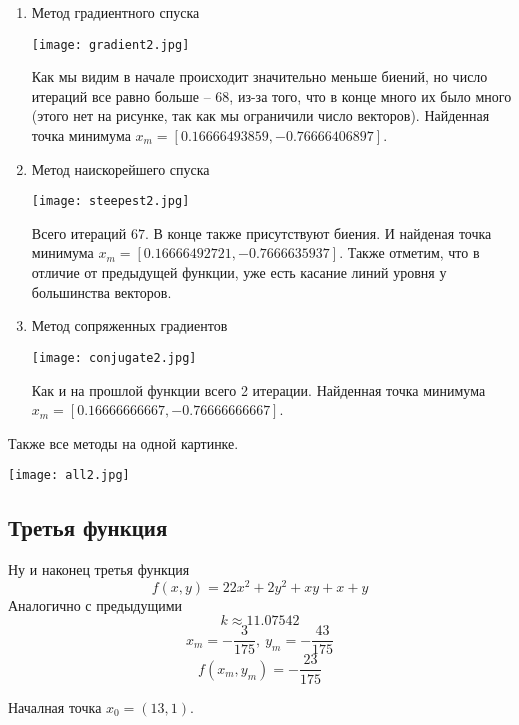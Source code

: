 \begin{enumerate}
    \item Метод градиентного спуска
    
    \texttt{[image: gradient2.jpg]}

    Как мы видим в начале происходит значительно меньше биений, но число
    итераций все равно больше -- 68, из-за того, что в конце много их было много
    (этого нет на рисунке, так как мы ограничили число векторов).
    Найденная точка минимума $x_m = [0.16666493859, -0.76666406897]$.



    \item Метод наискорейшего спуска

    \texttt{[image: steepest2.jpg]}

    Всего итераций $67$. В конце также присутствуют биения. 
    И найденая точка минимума \newline $x_m = [0.16666492721, -0.7666635937]$.
    Также отметим, что в отличие от предыдущей функции, уже есть касание линий уровня у большинства векторов.

    \item Метод сопряженных градиентов
    
    \texttt{[image: conjugate2.jpg]}

    Как и на прошлой функции всего 2 итерации. Найденная точка минимума $x_m = [0.16666666667, -0.76666666667]$.

\end{enumerate}

Также все методы на одной картинке.

\texttt{[image: all2.jpg]}

\subsection{Третья функция}
Ну и наконец третья функция $$f(x, y) = 22x^2 + 2y^2 + xy + x + y$$
Аналогично с предыдущими
$$k \approx 11.07542$$
$$x_m = -\frac{3}{175},\ y_m = -\frac{43}{175}$$
$$f(x_m, y_m) = -\frac{23}{175}$$

Началная точка $x_0 = (13, 1)$.


